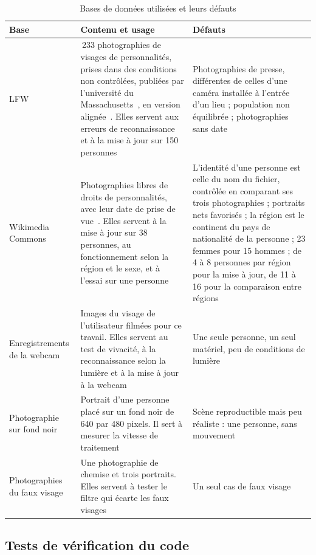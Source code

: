 \begin{table}[H]
\centering
\caption{Bases de données utilisées et leurs défauts\majmark}\label{tab:bases}
\small
\begin{tabularx}{\textwidth}{@{}>{\raggedright\arraybackslash}p{2.4cm}>{\raggedright\arraybackslash}p{5cm}>{\raggedright\arraybackslash}X@{}}
\toprule
\textbf{Base} & \textbf{Contenu et usage} & \textbf{Défauts} \\
\midrule
LFW & 13\,233 photographies de visages de personnalités, prises dans des conditions non contrôlées, publiées par l'université du Massachusetts~\cite{huang2007lfw}, en version alignée~\cite{huang2007funneling}. Elles servent aux erreurs de reconnaissance et à la mise à jour sur 150 personnes & Photographies de presse, différentes de celles d'une caméra installée à l'entrée d'un lieu ; population non équilibrée ; photographies sans date \\
Wikimedia Commons & Photographies libres de droits de personnalités, avec leur date de prise de vue~\cite{wikimedia_commons}. Elles servent à la mise à jour sur 38 personnes, au fonctionnement selon la région et le sexe, et à l'essai sur une personne & L'identité d'une personne est celle du nom du fichier, contrôlée en comparant ses trois photographies ; portraits nets favorisés ; la région est le continent du pays de nationalité de la personne ; 23 femmes pour 15 hommes ; de 4 à 8 personnes par région pour la mise à jour, de 11 à 16 pour la comparaison entre régions \\
Enregistrements de la webcam & Images du visage de l'utilisateur filmées pour ce travail. Elles servent au test de vivacité, à la reconnaissance selon la lumière et à la mise à jour à la webcam & Une seule personne, un seul matériel, peu de conditions de lumière \\
Photographie sur fond noir & Portrait d'une personne placé sur un fond noir de 640 par 480 pixels. Il sert à mesurer la vitesse de traitement & Scène reproductible mais peu réaliste : une personne, sans mouvement \\
Photographies du faux visage & Une photographie de chemise et trois portraits. Elles servent à tester le filtre qui écarte les faux visages & Un seul cas de faux visage \\
\bottomrule
\end{tabularx}
\end{table}

\subsection{Tests de vérification du code}

